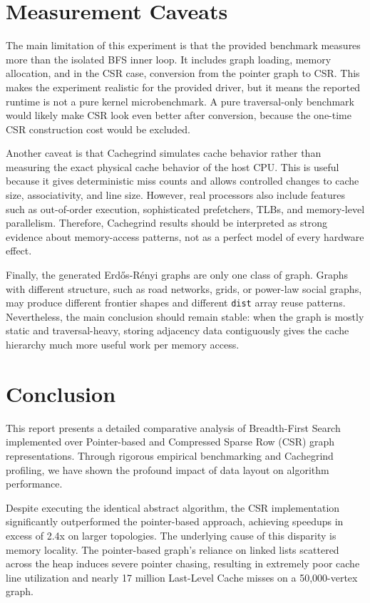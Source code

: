 \documentclass[11pt]{article}
\begin{document}
\section{Measurement Caveats}

The main limitation of this experiment is that the provided benchmark measures more than the isolated BFS inner loop. It includes graph loading, memory allocation, and in the CSR case, conversion from the pointer graph to CSR. This makes the experiment realistic for the provided driver, but it means the reported runtime is not a pure kernel microbenchmark. A pure traversal-only benchmark would likely make CSR look even better after conversion, because the one-time CSR construction cost would be excluded.

Another caveat is that Cachegrind simulates cache behavior rather than measuring the exact physical cache behavior of the host CPU. This is useful because it gives deterministic miss counts and allows controlled changes to cache size, associativity, and line size. However, real processors also include features such as out-of-order execution, sophisticated prefetchers, TLBs, and memory-level parallelism. Therefore, Cachegrind results should be interpreted as strong evidence about memory-access patterns, not as a perfect model of every hardware effect.

Finally, the generated Erd\H{o}s-R\'enyi graphs are only one class of graph. Graphs with different structure, such as road networks, grids, or power-law social graphs, may produce different frontier shapes and different \texttt{dist} array reuse patterns. Nevertheless, the main conclusion should remain stable: when the graph is mostly static and traversal-heavy, storing adjacency data contiguously gives the cache hierarchy much more useful work per memory access.

\section{Conclusion}

This report presents a detailed comparative analysis of Breadth-First Search implemented over Pointer-based and Compressed Sparse Row (CSR) graph representations. Through rigorous empirical benchmarking and Cachegrind profiling, we have shown the profound impact of data layout on algorithm performance.

Despite executing the identical abstract algorithm, the CSR implementation significantly outperformed the pointer-based approach, achieving speedups in excess of 2.4x on larger topologies. The underlying cause of this disparity is memory locality. The pointer-based graph's reliance on linked lists scattered across the heap induces severe pointer chasing, resulting in extremely poor cache line utilization and nearly 17 million Last-Level Cache misses on a 50,000-vertex graph.
\end{document}
